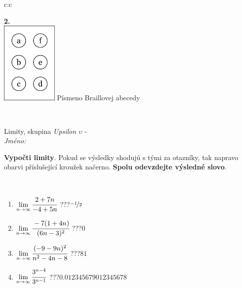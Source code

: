 \documentclass[10pt]{report}
\begin{document}
\begin{tabular}{c:c}
\begin{minipage}[c][104.5mm][t]{0.5\linewidth}
\begin{center}
\begin{minipage}{0.20\linewidth}
\begin{center}
{\Huge\bfseries 2.} \\[2mm]
\includegraphics[height=40mm]{../images/braille.png}
{\small Písmeno Braillovej abecedy}
\end{center}
\end{minipage}
\end{center}
\end{minipage}
\\ \hdashline
\begin{minipage}[c][104.5mm][t]{0.5\linewidth}
\begin{center}
\vspace{7mm}
{\huge Limity, skupina \textit{Upsilon $\upsilon$} -}\\[5mm]
\textit{Jméno:}\phantom{xxxxxxxxxxxxxxxxxxxxxxxxxxxxxxxxxxxxxxxxxxxxxxxxxxxxxxxxxxxxxxxxx}\\[5mm]
\begin{minipage}{0.95\linewidth}
\begin{center}
\textbf{Vypočti limity}. Pokud se výsledky shodujú s tými za otazníky, tak napravo\\obarvi příslušející kroužek načerno. \textbf{Spolu odevzdejte výsledné slovo}.
\end{center}
\end{minipage}
\\[1mm]
\begin{minipage}{0.79\linewidth}
\begin{center}
\begin{varwidth}{\linewidth}
\begin{enumerate}
\normalsize
\item $\lim\limits_{n\to\infty}\cfrac{2+7n}{-4+5n}$\quad \dotfill\; ???\;\dotfill \quad $\nicefrac{-1}{2}$
\item $\lim\limits_{n\to\infty}\cfrac{-7(1+4n)}{(6n-3)^2}$\quad \dotfill\; ???\;\dotfill \quad $0$
\item $\lim\limits_{n\to\infty}\cfrac{(-9-9n)^2}{n^2-4n-8}$\quad \dotfill\; ???\;\dotfill \quad $81$
\item $\lim\limits_{n\to\infty}\cfrac{3^{n-4}}{3^{n-1}}$\quad \dotfill\; ???\;\dotfill \quad $0.012345679012345678$

\end{enumerate}
\end{varwidth}
\end{center}
\end{minipage}
\end{center}
\end{minipage}
\end{tabular}
\end{document}

